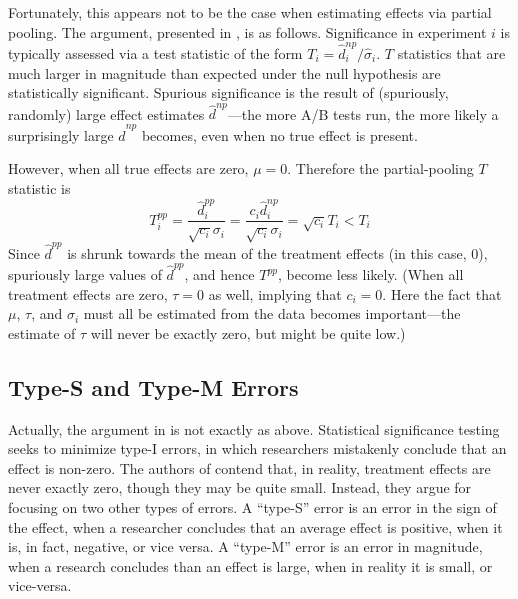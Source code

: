 \documentclass{edm_template}
\newcommand{\tauhat}{\hat{d}^{np}}
\newcommand{\shrink}{\hat{d}^{pp}}
\newcommand{\tshrink}{T^{pp}}
\begin{document}
Fortunately, this appears not to be the case when estimating effects via partial pooling.
The argument, presented in \cite{gelmanMultiple}, is as follows.
Significance in experiment $i$ is typically assessed via a test statistic of the form $T_i=\tauhat_i/\hat{\sigma}_i$.
$T$ statistics that are much larger in magnitude than expected under the null hypothesis are statistically significant. 
Spurious significance is the result of (spuriously, randomly) large effect estimates $\tauhat$---the more A/B tests run, the more likely a surprisingly large $\tauhat$ becomes, even when no true effect is present. 

However, when all true effects are zero, $\mu=0$.
Therefore the partial-pooling $T$ statistic is 
\begin{equation*}
\tshrink_i=\frac{\shrink_i}{\sqrt{c_i}\sigma_i}=\frac{c_i\tauhat_i}{\sqrt{c_i}\sigma_i}=\sqrt{c_i}T_i<T_i
\end{equation*}
Since $\shrink$ is shrunk towards the mean of the treatment effects (in this case, 0), spuriously large values of $\shrink$, and hence $\tshrink$, become less likely.
(When all treatment effects are zero, $\tau=0$ as well, implying that $c_i=0$. Here the fact that $\mu$, $\tau$, and $\sigma_i$ must all be estimated from the data becomes important---the estimate of $\tau$ will never be exactly zero, but might be quite low.)

\subsection{Type-S and Type-M Errors}
Actually, the argument in \cite{gelmanMultiple} is not exactly as above. Statistical significance testing seeks to minimize type-I errors, in which researchers mistakenly conclude that an effect is non-zero.
The authors of \cite{gelmanMultiple} contend that, in reality, treatment effects are never exactly zero, though they may be quite small. 
Instead, they argue for focusing on two other types of errors.
A ``type-S'' error is an error in the sign of the effect, when a researcher concludes that an average effect is positive, when it is, in fact, negative, or vice versa.
A ``type-M'' error is an error in magnitude, when a research concludes than an effect is large, when in reality it is small, or vice-versa.
\end{document}
